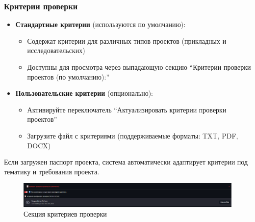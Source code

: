 \documentclass[a4paper,12pt]{article}
\begin{document}
\FloatBarrier
\begin{samepage}
\subsubsection{Критерии проверки}
\begin{itemize}
    \item \textbf{Стандартные критерии} (используются по умолчанию):
    \begin{itemize}
        \item Содержат критерии для различных типов проектов (прикладных и исследовательских)
        \item Доступны для просмотра через выпадающую секцию ``Критерии проверки проектов (по умолчанию):''
    \end{itemize}

    \item \textbf{Пользовательские критерии} (опционально):
    \begin{itemize}
        \item Активируйте переключатель ``Актуализировать критерии проверки проектов''
        \item Загрузите файл с критериями (поддерживаемые форматы: TXT, PDF, DOCX)
    \end{itemize}
\end{itemize}
\end{samepage}

\begin{tcolorbox}[colback=blue!5!white,colframe=blue!75!black,title=Примечание]
Если загружен паспорт проекта, система автоматически адаптирует критерии под тематику и требования проекта.
\end{tcolorbox}

\begin{figure}[!htb]
    \centering
    \includegraphics[width=\linewidth]{assets/criteria.png}
    \caption{Секция критериев проверки}
\end{figure}
\end{document}
